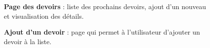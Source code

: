 \documentclass[12pt]{report}
\begin{document}
\begin{figure}[H]
\begin{minipage}[t]{0.45\textwidth}
			\caption*{\textbf{Page des devoirs} : liste des prochains devoirs, ajout d’un nouveau et visualisation des détails.}
		\end{minipage}
		\hfill
		\begin{minipage}[t]{0.45\textwidth}
			\centering
			\caption*{\textbf{Ajout d'un devoir} : page qui permet à l'utilisateur d'ajouter un devoir à la liste.}
		\end{minipage}
	\end{figure}
	
\end{document}
